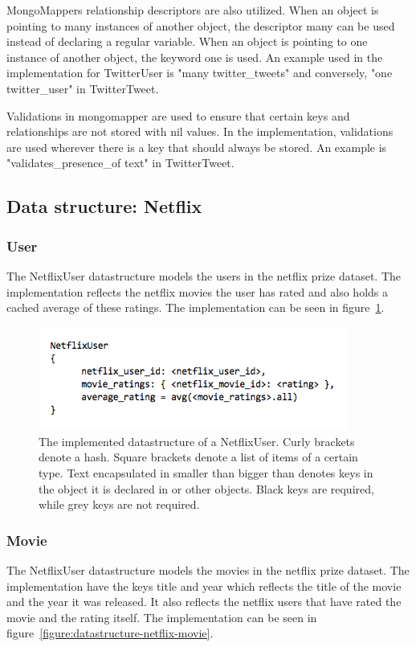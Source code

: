MongoMappers relationship descriptors are also utilized. When an object is pointing to many instances of another object, the descriptor many can be used instead of declaring a regular variable. When an object is pointing to one instance of another object, the keyword one is used. An example used in the implementation for TwitterUser is "many twitter\_tweets" and conversely, "one twitter\_user" in TwitterTweet.

Validations in mongomapper are used to ensure that certain keys and relationships are not stored with nil values. In the implementation, validations are used wherever there is a key that should always be stored. An example is "validates\_presence\_of text" in TwitterTweet.


\subsection{Data structure: Netflix}

\subsubsection{User}
The NetflixUser datastructure models the users in the netflix prize dataset. The implementation reflects the netflix movies the user has rated and also holds a cached average of these ratings. The implementation can be seen in figure~\ref{figure:datastructure-netflix-user}.

	\begin{figure}[H]
	\includegraphics[width=4in]{image/datastructure-netflix-user.png}
	\centering
	\caption{The implemented datastructure of a NetflixUser. Curly brackets denote a hash. Square brackets denote a list of items of a certain type. Text encapsulated in smaller than bigger than denotes keys in the object it is declared in or other objects. Black keys are required, while grey keys are not required.}
	\label{figure:datastructure-netflix-user}
	\end{figure}

\subsubsection{Movie}
The NetflixUser datastructure models the movies in the netflix prize dataset. The implementation have the keys title and year which reflects the title of the movie and the year it was released. It also reflects the netflix users that have rated the movie and the rating itself. The implementation can be seen in figure~\ref{figure:datastructure-netflix-movie}.

